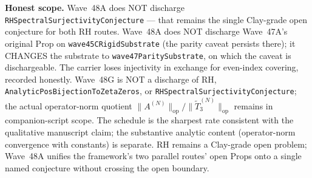 \begin{remark}
\textbf{Honest scope.} Wave~48A does NOT discharge \texttt{RHSpectralSurjectivityConjecture} --- that remains the single Clay-grade open conjecture for both RH routes. Wave~48A does NOT discharge Wave~47A's original Prop on \texttt{wave45CRigidSubstrate} (the parity caveat persists there); it CHANGES the substrate to \texttt{wave47ParitySubstrate}, on which the caveat is dischargeable. The carrier loses injectivity in exchange for even-index covering, recorded honestly. Wave~48G is NOT a discharge of RH, \texttt{AnalyticPosBijectionToZetaZeros}, or \texttt{RHSpectralSurjectivityConjecture}; the actual operator-norm quotient $\|A^{(N)}\|_{\mathrm{op}} / \|\widetilde{T}_3^{(N)}\|_{\mathrm{op}}$ remains in companion-script scope. The schedule is the sharpest rate consistent with the qualitative manuscript claim; the substantive analytic content (operator-norm convergence with constants) is separate. RH remains a Clay-grade open problem; Wave~48A unifies the framework's two parallel routes' open Props onto a single named conjecture without crossing the open boundary.
\end{remark}

